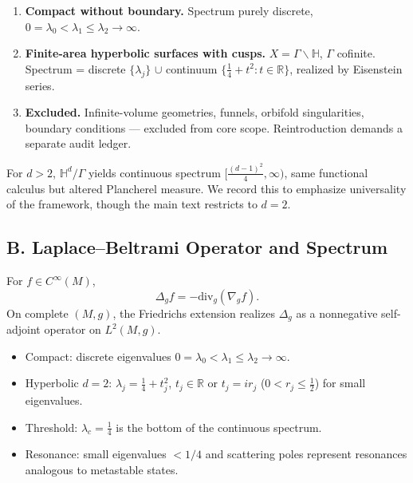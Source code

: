 \begin{definition}
\begin{enumerate}[label=(\roman*)]
  \item \textbf{Compact without boundary.} Spectrum purely discrete, $0=\lambda_0<\lambda_1\le\lambda_2\to\infty$.
  \item \textbf{Finite-area hyperbolic surfaces with cusps.} $X=\Gamma\backslash\mathbb H$, $\Gamma$ cofinite. Spectrum = discrete $\{\lambda_j\}$ $\cup$ continuum $\{\tfrac14+t^2:t\in\mathbb R\}$, realized by Eisenstein series.
  \item \textbf{Excluded.} Infinite-volume geometries, funnels, orbifold singularities, boundary conditions — excluded from core scope. Reintroduction demands a separate audit ledger.
\end{enumerate}
\end{definition}

\begin{remark}
For $d>2$, $\mathbb H^d/\Gamma$ yields continuous spectrum $[\tfrac{(d-1)^2}{4},\infty)$, same functional calculus but altered Plancherel measure. We record this to emphasize universality of the framework, though the main text restricts to $d=2$.
\end{remark}


\subsection*{B. Laplace–Beltrami Operator and Spectrum}
\label{subsec:laplacian-sharp-patched}

\begin{definition}
For $f\in C^\infty(M)$,
\[
  \Delta_g f = -\mathrm{div}_g(\nabla_g f).
\]
On complete $(M,g)$, the Friedrichs extension realizes $\Delta_g$ as a nonnegative self-adjoint operator on $L^2(M,g)$.
\end{definition}

\begin{conditions}
\begin{itemize}
  \item Compact: discrete eigenvalues $0=\lambda_0<\lambda_1\le\lambda_2\to\infty$.
  \item Hyperbolic $d=2$: $\lambda_j=\tfrac14+t_j^2$, $t_j\in\mathbb R$ or $t_j=i r_j$ ($0<r_j\le \tfrac12$) for small eigenvalues.
  \item Threshold: $\lambda_c=\tfrac14$ is the bottom of the continuous spectrum.
  \item Resonance: small eigenvalues $<1/4$ and scattering poles represent resonances analogous to metastable states.
\end{itemize}
\end{conditions}

